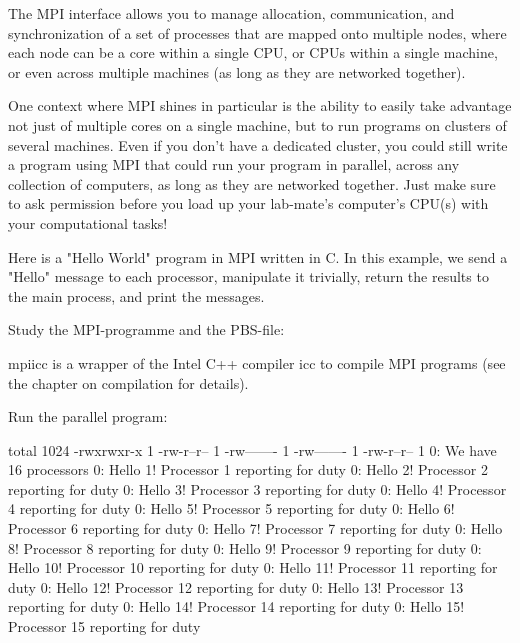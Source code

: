 The MPI interface allows you to manage allocation, communication, and
synchronization of a set of processes that are mapped onto multiple nodes,
where each node can be a core within a single CPU, or CPUs within a single
machine, or even across multiple machines (as long as they are networked
together).

One context where MPI shines in particular is the ability to easily take
advantage not just of multiple cores on a single machine, but to run programs
on clusters of several machines. Even if you don't have a dedicated cluster,
you could still write a program using MPI that could run your program in
parallel, across any collection of computers, as long as they are networked
together. Just make sure to ask permission before you load up your lab-mate's
computer's CPU(s) with your computational tasks!

Here is a "Hello World" program in MPI written in C. In this example, we send a
"Hello" message to each processor, manipulate it trivially, return the results
to the main process, and print the messages.

Study the MPI-programme and the PBS-file:


mpiicc is a wrapper of the Intel C++ compiler icc to compile MPI programs (see
the chapter on compilation for details).

Run the parallel program:

\begin{prompt}
total 1024
-rwxrwxr-x 1 %
-rw-r--r-- 1 %
-rw------- 1 %
-rw------- 1 %
-rw-r--r-- 1 %
0: We have 16 processors
0: Hello 1! Processor 1 reporting for duty
0: Hello 2! Processor 2 reporting for duty
0: Hello 3! Processor 3 reporting for duty
0: Hello 4! Processor 4 reporting for duty
0: Hello 5! Processor 5 reporting for duty
0: Hello 6! Processor 6 reporting for duty
0: Hello 7! Processor 7 reporting for duty
0: Hello 8! Processor 8 reporting for duty
0: Hello 9! Processor 9 reporting for duty
0: Hello 10! Processor 10 reporting for duty
0: Hello 11! Processor 11 reporting for duty
0: Hello 12! Processor 12 reporting for duty
0: Hello 13! Processor 13 reporting for duty
0: Hello 14! Processor 14 reporting for duty
0: Hello 15! Processor 15 reporting for duty
\end{prompt}


